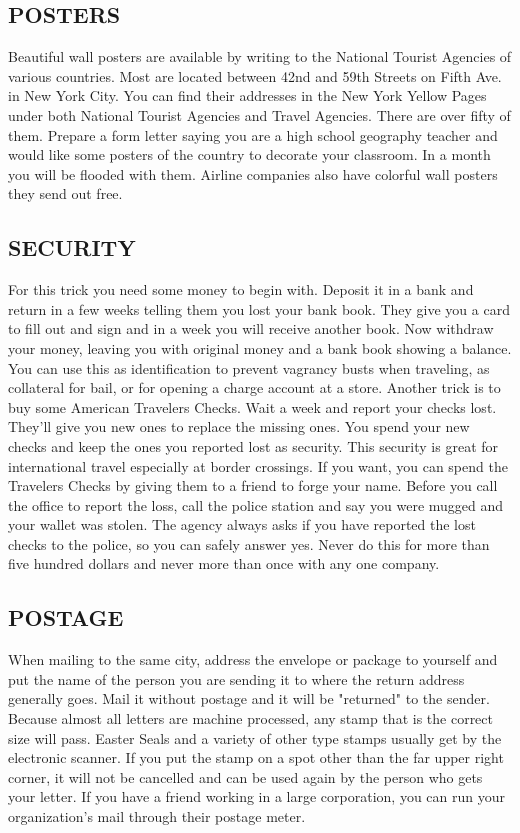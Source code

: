 \documentclass[11pt,twoside,a4paper]{book}
\begin{document}
\subsection{POSTERS}

Beautiful wall posters are available by writing to the National Tourist Agencies of various countries. Most are located between 42nd and 59th Streets on Fifth Ave. in New York City. You can find their addresses in the New York Yellow Pages under both National Tourist Agencies and Travel Agencies. There are over fifty of them. Prepare a form letter saying you are a high school geography teacher and would like some posters of the country to decorate your classroom. In a month you will be flooded with them. Airline companies also have colorful wall posters they send out free.

\subsection{SECURITY}

For this trick you need some money to begin with. Deposit it in a bank and return in a few weeks telling them you lost your bank book. They give you a card to fill out and sign and in a week you will receive another book. Now withdraw your money, leaving you with original money and a bank book showing a balance. You can use this as identification to prevent vagrancy busts when traveling, as collateral for bail, or for opening a charge account at a store. Another trick is to buy some American Travelers Checks. Wait a week and report your checks lost. They'll give you new ones to replace the missing ones. You spend your new checks and keep the ones you reported lost as security. This security is great for international travel especially at border crossings. If you want, you can spend the Travelers Checks by giving them to a friend to forge your name. Before you call the office to report the loss, call the police station and say you were mugged and your wallet was stolen. The agency always asks if you have reported the lost checks to the police, so you can safely answer yes. Never do this for more than five hundred dollars and never more than once with any one company.~\\

\subsection{POSTAGE}

When mailing to the same city, address the envelope or package to yourself and put the name of the person you are sending it to where the return address generally goes. Mail it without postage and it will be "returned" to the sender. Because almost all letters are machine processed, any stamp that is the correct size will pass. Easter Seals and a variety of other type stamps usually get by the electronic scanner. If you put the stamp on a spot other than the far upper right corner, it will not be cancelled and can be used again by the person who gets your letter. If you have a friend working in a large corporation, you can run your organization's mail through their postage meter.~\\
\end{document}

